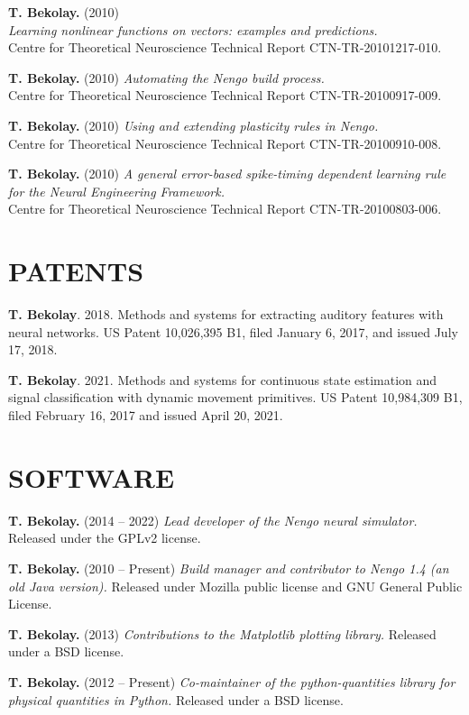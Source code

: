 \documentclass[line,margin]{res}
\begin{document}
\begin{resume}
\textbf{T. Bekolay.} (2010) \\
  {\sl Learning nonlinear functions on vectors: examples and predictions.} \\
  Centre for Theoretical Neuroscience Technical Report CTN-TR-20101217-010.

\textbf{T. Bekolay.} (2010)
  {\sl Automating the Nengo build process.} \\
  Centre for Theoretical Neuroscience Technical Report CTN-TR-20100917-009.

\textbf{T. Bekolay.} (2010)
  {\sl Using and extending plasticity rules in Nengo.} \\
  Centre for Theoretical Neuroscience Technical Report CTN-TR-20100910-008.

\textbf{T. Bekolay.} (2010)
  {\sl A general error-based spike-timing dependent learning rule for
  the Neural Engineering Framework.} \\
  Centre for Theoretical Neuroscience Technical Report CTN-TR-20100803-006.

\section{PATENTS}

\textbf{T. Bekolay}. 2018. Methods and systems for extracting auditory features with neural networks.
  US Patent 10,026,395 B1, filed January 6, 2017, and issued July 17, 2018.

\textbf{T. Bekolay}. 2021. Methods and systems for continuous state estimation and signal classification
  with dynamic movement primitives. US Patent 10,984,309 B1, filed February 16, 2017 and issued
  April 20, 2021.

\section{SOFTWARE}

\textbf{T. Bekolay.} (2014 -- 2022)
  {\sl Lead developer of the Nengo neural simulator.}
  Released under the GPLv2 license.

\textbf{T. Bekolay.} (2010 -- Present)
  {\sl Build manager and contributor to Nengo 1.4 (an old Java version).}
  Released under Mozilla public license and GNU General Public License.

\textbf{T. Bekolay.} (2013)
  {\sl Contributions to the Matplotlib plotting library.}
  Released under a BSD license.

\textbf{T. Bekolay.} (2012 -- Present)
  {\sl Co-maintainer of the python-quantities library for physical quantities
  in Python.} Released under a BSD license.


\end{resume}
\end{document}
